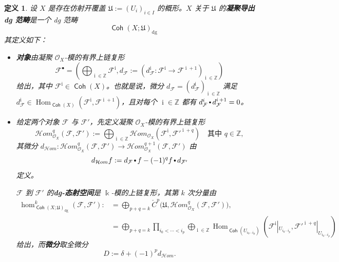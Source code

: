 \documentclass[11pt,a4paper]{article}
\renewcommand{\emph}[1]{{\bfseries #1}}
\DeclareMathOperator{\Coh}{\mathsf{Coh}}
\DeclareMathOperator{\field}{\mathbb{k}}
\DeclareMathOperator{\Hom}{\operatorname{Hom}}
\DeclareMathOperator{\dg}{\operatorname{dg}}
\DeclareMathOperator{\comp}{\vcenter{\hbox{\scalebox{0.65}{$\bullet$}}}}
\DeclareMathOperator{\objectdegree}{{\text{$i$}}}
\theoremstyle{cnth}
\newtheorem{dfn}[thm]{定义}
\begin{document}
\begin{dfn}\label{dfn:dg-enhancement-Coh}
设 $X$ 是存在仿射开覆盖 $\mathfrak{U}:=(U_i)_{i\in I}$ 的概形。$X$ 关于 $\mathfrak{U}$ 的\emph{凝聚导出 dg 范畴}是一个 dg 范畴
$$
\Coh(X;\mathfrak{U})_{\dg}
$$
其定义如下：
\begin{itemize}
\item
\emph{对象}由凝聚 $\mathcal{O}_X$-模的有界上链复形
$$
\mathcal{F}^{\bullet}
=
\left(
\bigoplus_{\objectdegree\in\mathbb{Z}}
\mathcal{F}^{\objectdegree},
d_{\mathcal{F}}:=\left(d_{\mathcal{F}}^{\objectdegree}:\mathcal{F}^{\objectdegree}\rightarrow \mathcal{F}^{\objectdegree+1}\right)_{\objectdegree\in\mathbb{Z}}\right)
$$
给出，其中 $\mathcal{F}^{\objectdegree}\in\Coh(X)$。也就是说，微分 $d_{\mathcal{F}}=(d_{\mathcal{F}}^{\objectdegree})_{\objectdegree\in\mathbb{Z}}$ 满足 $d_{\mathcal{F}}^{\objectdegree}\in \Hom_{\Coh(X)}(\mathcal{F}^{\objectdegree},\mathcal{F}^{\objectdegree+1})$，且对每个 $\objectdegree\in\mathbb{Z}$ 都有 $d_{\mathcal{F}}^{\objectdegree}\comp d_{\mathcal{F}}^{\objectdegree+1}=0$。

\item
给定两个对象 $\mathcal{F}$ 与 $\mathcal{F}'$，先定义凝聚 $\mathcal{O}_X$-模的有界上链复形
$$
\mathcal{H}om_{\mathcal{O}_X}^q\left(\mathcal{F},\mathcal{F}'\right)
:=
\bigoplus_{\objectdegree\in\mathbb{Z}}
\mathcal{H}om_{\mathcal{O}_X}\left(\mathcal{F}^{\objectdegree},\mathcal{F}'^{\objectdegree+q}\right)
\quad\text{其中 }q\in\mathbb{Z},
$$
其微分
$
d_{\mathcal{H}om}:
\mathcal{H}om_{\mathcal{O}_X}^q(\mathcal{F},\mathcal{F}')
\rightarrow
\mathcal{H}om_{\mathcal{O}_X}^{q+1}(\mathcal{F},\mathcal{F}')
$
由
$$
d_{\mathcal{H}om}f:=d_{\mathcal{F}}\comp f - (-1)^q f\comp d_{\mathcal{F}'}
$$
定义。

$\mathcal{F}$ 到 $\mathcal{F}'$ 的\emph{dg-态射空间}是 $\field$-模的上链复形，其第 $k$ 次分量由
\begin{align*}
\hom_{\Coh(X;\mathfrak{U})_{\dg}}^k
\left(
\mathcal{F},\mathcal{F}'
\right)
:&=
\bigoplus_{p+q=k}
\check{C}^p\big(\mathfrak{U},\mathcal{H}om_{\mathcal{O}_X}^q
(\mathcal{F},\mathcal{F}')
\big),
\\[2mm]
&=
\bigoplus_{p+q=k}
\prod_{i_0<\cdots<i_p}\bigoplus_{\objectdegree\in\mathbb{Z}}
\Hom_{\Coh(U_{i_0\cdots i_p})}\left(\mathcal{F}^{\objectdegree}|_{U_{i_0\cdots i_p}},\mathcal{F}'^{\objectdegree+q}|_{U_{i_0\cdots i_p}}\right)
\end{align*}
给出，而\emph{微分}取全微分
$$
D
:=
\delta + (-1)^p d_{\mathcal{H}om}.
$$


\end{itemize}
\end{dfn}
\end{document}
